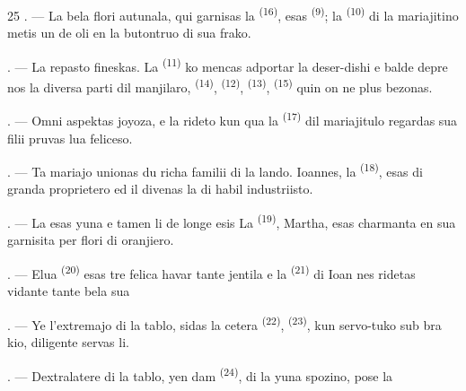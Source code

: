 \begin{VUpage}[27]{25}
. --- La bela flori autunala, qui garnisas la\nl
{} \textsuperscript{(16)}, esas  \textsuperscript{(9)}; la  \textsuperscript{(10)} di\nl
la mariajitino metis un de oli en la butontruo\nl
di sua frako.

. --- La repasto fineskas. La  \textsuperscript{(11)} ko\cc
mencas adportar la deser-dishi e balde depre\cc
nos la diversa parti dil manjilaro,  \textsuperscript{(14)},\nl
{} \textsuperscript{(12)},  \textsuperscript{(13)},  \textsuperscript{(15)} quin on ne\nl
plus bezonas.

\VUsaut{3.0mm}

. --- Omni aspektas joyoza, e la rideto kun\nl
qua la  \textsuperscript{(17)} dil mariajitulo regardas sua\nl
filii pruvas lua feliceso.

. --- Ta mariajo unionas du richa familii di\nl
la lando. Ioannes, la  \textsuperscript{(18)}, esas  di\nl
granda proprietero ed il divenas la  di\nl
habil industriisto.

. --- La  esas yuna e tamen li de longe\nl
esis  La  \textsuperscript{(19)}, Martha, esas\nl
charmanta en sua  garnisita per\nl
flori di oranjiero.

. --- Elua  \textsuperscript{(20)} esas tre felica havar\nl
tante jentila  e la  \textsuperscript{(21)} di Ioan\cc
nes ridetas vidante tante bela sua 

. --- Ye l'extremajo di la tablo, sidas la\nl
cetera  \textsuperscript{(22)}, \cc
{}  \textsuperscript{(23)}, kun servo-tuko sub bra\cc
kio, diligente servas li.

\VUsaut{3.0mm}

. --- Dextralatere di la tablo, yen dam\cc
{} \textsuperscript{(24)},  di la yuna spozino, pose la
\parplein
\end{VUpage}

